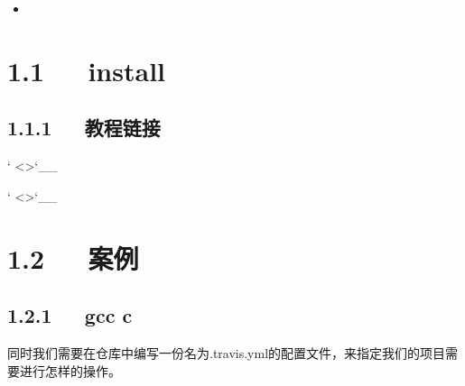 \documentclass[letterpaper,12pt,english]{sphinxmanual}
\begin{document}
\begin{sphinxShadowBox}
\begin{itemize}
\begin{itemize}
\begin{itemize}
\begin{itemize}
\item {} 
\label{\detokenize{001software/001install/001._u7f51_u7ad9/travisCI:id19}}{\hyperref[\detokenize{001software/001install/001._u7f51_u7ad9/travisCI:id4}]{}}

\end{itemize}

\end{itemize}

\end{itemize}

\end{itemize}
\end{sphinxShadowBox}


\section{1.1   install}
\label{\detokenize{001software/001install/001._u7f51_u7ad9/travisCI:install}}


\subsection{1.1.1   教程链接}
\label{\detokenize{001software/001install/001._u7f51_u7ad9/travisCI:id1}}




` <>`\_\_

` <>`\_\_


\section{1.2   案例}
\label{\detokenize{001software/001install/001._u7f51_u7ad9/travisCI:id2}}

\subsection{1.2.1   gcc c}
\label{\detokenize{001software/001install/001._u7f51_u7ad9/travisCI:gcc-c}}
同时我们需要在仓库中编写一份名为.travis.yml的配置文件，来指定我们的项目需要进行怎样的操作。
\end{document}
